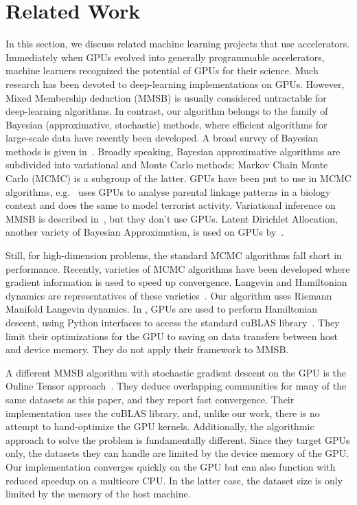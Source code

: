 \section{Related Work}

In this section, we discuss related machine learning projects that use
accelerators.
Immediately when GPUs evolved into generally programmable accelerators, machine
learners recognized the potential of GPUs for their science.
Much research
has been devoted to deep-learning implementations on GPUs. However, Mixed
Membership deduction (MMSB) is usually considered untractable for deep-learning
algorithms. In contrast, our algorithm belongs to the family of Bayesian
(approximative, stochastic) methods, where efficient algorithms for large-scale
data have recently been developed. A broad survey of Bayesian methods is given
in~\cite{DBLP:journals/corr/Zhu0H14}. Broadly speaking, Bayesian approximative
algorithms are subdivided into variational and Monte Carlo methods; Markov
Chain Monte Carlo (MCMC) is a subgroup of the latter. GPUs have been put to
use in MCMC algorithms, e.g.\ \cite{journals/bioinformatics/MedlarGSBK13}
uses GPUs to analyse parental linkage patterns in a biology context and
\cite{DBLP:journals/csda/WhiteP14} does the same to model terrorist activity.
Variational inference on MMSB is described
in~\cite{DBLP:conf/nips/GopalanMGFB12}, but they don't use GPUs. Latent
Dirichlet Allocation, another variety of Bayesian Approximation, is used on
GPUs by~\cite{DBLP:conf/nips/YanXQ09}.

Still, for high-dimension problems, the standard MCMC algorithms fall short in
performance. Recently, varieties of MCMC algorithms have been developed where
gradient information is used to speed up convergence. Langevin and Hamiltonian
dynamics are representatives of these
varieties~\cite{Girolami_riemannmanifold}.  Our algorithm uses Riemann Manifold
Langevin dynamics. In \cite{beam2014fast}, GPUs are used to perform Hamiltonian
descent, using Python interfaces to access the standard cuBLAS
library~\cite{cuBLAS}. They limit their optimizations for the GPU to
saving on data transfers between host and device memory. They do not apply
their framework to MMSB.

A different MMSB algorithm with stochastic gradient descent on the GPU is
the Online Tensor approach~\cite{DBLP:journals/corr/HuangNHVA13}. They deduce
overlapping communities for many of the same datasets as this paper, and they
report fast convergence. Their implementation uses the cuBLAS
library, and, unlike our work, there is no attempt to hand-optimize the GPU
kernels. Additionally, the algorithmic approach to solve the problem is
fundamentally different.
Since they target GPUs only, the datasets they
can handle are limited by the device memory of the GPU. Our implementation converges
quickly on the GPU but can also function with reduced speedup on a multicore
CPU. In the latter case, the dataset
size is only limited by the memory of the host machine.


